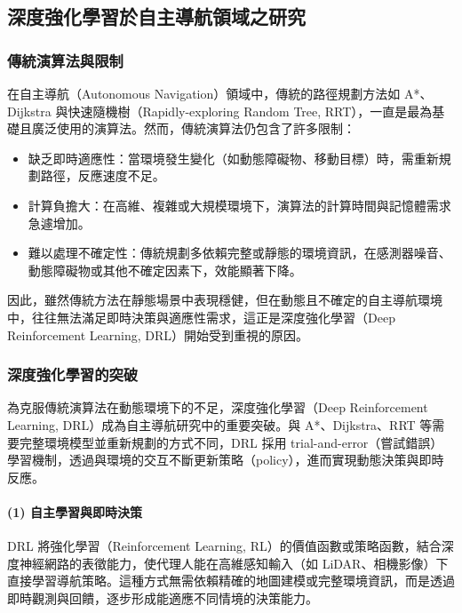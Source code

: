 \documentclass[12pt,a4paper]{article}
\begin{document}
\subsection{深度強化學習於自主導航領域之研究}

\subsubsection{傳統演算法與限制}
在自主導航（Autonomous Navigation）領域中，傳統的路徑規劃方法如 A*、Dijkstra 與快速隨機樹（Rapidly-exploring Random Tree, RRT），一直是最為基礎且廣泛使用的演算法。然而，傳統演算法仍包含了許多限制\cite{PathPlanning}：
\begin{itemize}
  \item 缺乏即時適應性：當環境發生變化（如動態障礙物、移動目標）時，需重新規劃路徑，反應速度不足\cite{EnhancedPathPlanning}。
  \item 計算負擔大：在高維、複雜或大規模環境下，演算法的計算時間與記憶體需求急遽增加\cite{SimulationHeuristic}。
  \item 難以處理不確定性：傳統規劃多依賴完整或靜態的環境資訊\cite{EnhancedPathPlanning}，在感測器噪音、動態障礙物或其他不確定因素下，效能顯著下降。
\end{itemize}

因此，雖然傳統方法在靜態場景中表現穩健，但在動態且不確定的自主導航環境中，往往無法滿足即時決策與適應性需求，這正是深度強化學習（Deep Reinforcement Learning, DRL）開始受到重視的原因。


\subsubsection{深度強化學習的突破}
為克服傳統演算法在動態環境下的不足，深度強化學習（Deep Reinforcement Learning, DRL）成為自主導航研究中的重要突破。與 A*、Dijkstra、RRT 等需要完整環境模型並重新規劃的方式不同，DRL 採用 trial-and-error（嘗試錯誤）學習機制，透過與環境的交互不斷更新策略（policy），進而實現動態決策與即時反應\cite{DRL2018}。

\paragraph{(1) 自主學習與即時決策}
DRL 將強化學習（Reinforcement Learning, RL）的價值函數或策略函數，結合深度神經網路的表徵能力，使代理人能在高維感知輸入（如 LiDAR、相機影像）下直接學習導航策略。這種方式無需依賴精確的地圖建模或完整環境資訊，而是透過即時觀測與回饋，逐步形成能適應不同情境的決策能力\cite{DRLAutonomous}\cite{DRLBased}。
\end{document}
